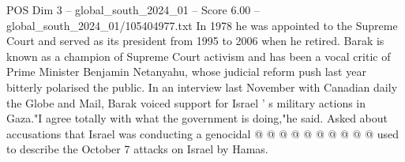 \begin{textsample}{POS Dim 3 – global\_south\_2024\_01 – Score 6.00 – global\_south\_2024\_01/105404977.txt}
In 1978 he was appointed to the Supreme Court and served as its president from 1995 to 2006 when he retired.
Barak is known as a champion of Supreme Court activism and has been a vocal critic of Prime Minister Benjamin Netanyahu, whose judicial reform push last year bitterly polarised the public.
In an interview last November with Canadian daily the Globe and Mail, Barak voiced support for Israel ' s military actions in Gaza."I agree totally with what the government is doing,"he said.
Asked about accusations that Israel was conducting a genocidal @ @ @ @ @ @ @ @ @ @ used to describe the October 7 attacks on Israel by Hamas.

\end{textsample}
